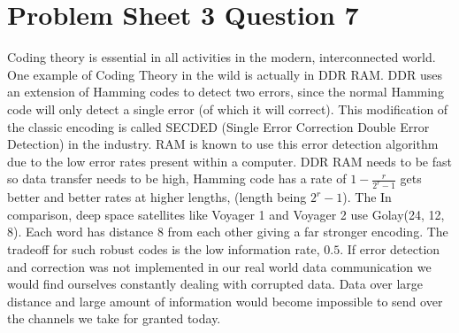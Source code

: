 \documentclass{article}
\begin{document}
\section{Problem Sheet 3 Question 7}
Coding theory is essential in all activities in the modern, interconnected
world. One example of Coding Theory in the wild is actually in DDR RAM.
DDR uses an extension of Hamming codes to detect two errors, since the normal
Hamming code will only detect a single error (of which it will correct). This
modification of the classic encoding is called SECDED (Single Error Correction
Double Error Detection) in the industry. RAM is known to use this error
detection algorithm due to the low error rates present within a computer.
DDR RAM needs to be fast so data transfer needs to be high, Hamming code has
a rate of $1 - \frac{r}{2^r - 1}$ gets better and better rates at higher
lengths, (length being $2^r - 1$). The 
In comparison, deep space satellites like Voyager 1 and Voyager 2 use
Golay(24, 12, 8). Each word has distance 8 from each other giving a far
stronger encoding. The tradeoff for such robust codes is the low information
rate, $0.5$. If error detection and correction was not implemented in our
real world data communication we would find ourselves constantly dealing with
corrupted data. Data over large distance and large amount of information
would become impossible to send over the channels we take for granted today.
\end{document}
